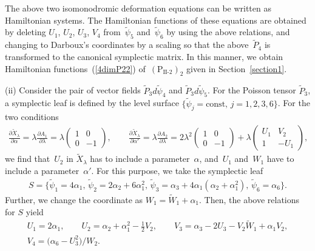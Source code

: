 \documentclass[10pt,a4paper]{amsart}
\numberwithin{equation}{section}
\begin{document}
The above two isomonodromic deformation equations can be written as Hamiltonian systems. The Hamiltonian functions of these equations are obtained by deleting $U_1$, $U_2$, $U_3$, $V_4$ from~$\widetilde{\psi}_5$ and~$\widetilde{\psi}_6$ by using the above relations, and changing to Darboux's coordinates by a scaling so that the above~$\widetilde{P}_4$ is transformed to the canonical symplectic matrix. In this manner, we obtain Hamiltonian functions~(\ref{4dimP22}) of~$(\text{P}_\text{II-2})_2$ given in Section~\ref{section1}.

(ii) Consider the pair of vector f\/ields $\widetilde{P}_3 d\widetilde{\psi}_4$ and $\widetilde{P}_3 d\widetilde{\psi}_5$. For the Poisson tensor $\widetilde{P}_3$, a symplectic leaf is def\/ined by the level surface $\{ \widetilde{\psi}_j = \text{const},\, j=1,2,3,6\}$. For the two conditions
\begin{gather}
\frac{\partial \widetilde{X}_\lambda }{\partial \alpha } = \lambda \frac{\partial A_1 }{\partial \lambda } = \lambda \left(
\begin{matrix}
1 & 0 \\
0 & -1
\end{matrix}
\right), \qquad
\frac{\partial \widetilde{X}_\lambda }{\partial \alpha' } = \lambda \frac{\partial A_2 }{\partial \lambda } = 2\lambda^2 \left(
\begin{matrix}
1 & 0 \\
0 & -1
\end{matrix}
\right) + \lambda \left(
\begin{matrix}
U_1 & V_2 \\
1 & -U_1
\end{matrix}
\right), \label{4-2}
\end{gather}
we f\/ind that~$U_2$ in $\widetilde{X}_\lambda $ has to include a parameter~$\alpha $, and~$U_1$ and~$W_1$ have to include a parame\-ter~$\alpha' $. For this purpose, we take the symplectic leaf
\begin{gather*}
S = \big\{ \widetilde{\psi}_1 = 4\alpha _1,\, \widetilde{\psi}_2 = 2\alpha _2+6\alpha _1^2 ,\, \widetilde{\psi}_3 = \alpha _3+4\alpha _1(\alpha _2+\alpha _1^2),\, \widetilde{\psi}_6 = \alpha _6 \big\}.
\end{gather*}
Further, we change the coordinate as $W_1 = \widetilde{W}_1 + \alpha _1$. Then, the above relations for $S$ yield
\begin{gather*}
 U_1 = 2\alpha _1,\qquad U_2 = \alpha _2+\alpha _1^2-\frac{1}{2}V_2,\qquad V_3 = \alpha _3- 2U_3-V_2\widetilde{W}_1 + \alpha _1V_2, \\
 V_4 = \big(\alpha _6-U_3^2\big)/W_2.
\end{gather*}
\end{document}
